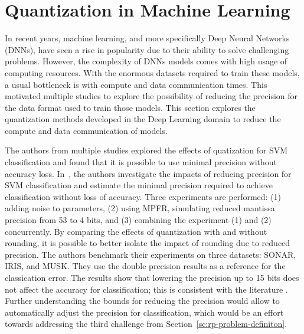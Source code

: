 \section{Quantization in Machine Learning}
In recent years, machine learning, and more specifically Deep Neural Networks (DNNs),
have seen a rise in popularity due to their ability to solve challenging problems.
However, the complexity of DNNs models comes with high usage of computing resources.
With the enormous datasets required to train these models, a usual bottleneck is with compute and data communication times.
This motivated multiple studies \cite{Johnson2018-up,Wang2018-oo,Lesser2011-mn,Chen2018-an,Judd2015-kw,Vicuna2021-mw}
to explore the possibility of reducing the precision for the data format used to train those models.
This section explores the quantization methods developed in the Deep Learning 
domain to reduce the compute and data communication of models.

The authors from multiple studies explored the effects of quatization for SVM classification
and found that it is possible to use minimal precision without accuracy loss.
In~\cite{Lesser2011-mn}, the authors investigate the impacts of reducing precision for SVM
classification and estimate the minimal precision required to achieve classification 
without loss of accuracy. Three experiments are performed: 
(1) adding noise to parameters,
(2) using MPFR, simulating reduced mantissa precision from 53 to 4 bits,
and (3) combining the experiment (1) and (2) concurrently.
By comparing the effects of quantization with and without rounding, it is possible to
better isolate the impact of rounding due to reduced precision.
The authors benchmark their experiments on three datasets: SONAR, IRIS, and MUSK.
They use the double precision results as a reference for the classication error.
The results show that lowering the precision up to 15 bits does not affect the accuracy
for classification; this is consistent with the literature .
Further understanding the bounds for reducing the precision would allow to automatically
adjust the precision for classification, which would be an effort towards addressing the third 
challenge from Section~\ref{sc:rp-problem-definiton}.

